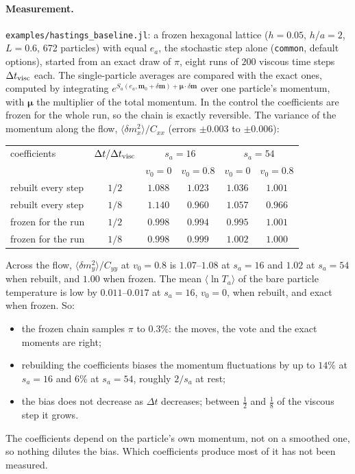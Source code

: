\documentclass[11pt,aps,preprint,nofootinbib,superscriptaddress,tightenlines]{revtex4-2}
\let\oldparagraph\paragraph
\renewcommand{\paragraph}{\par\bigskip\oldparagraph}
\begin{document}
\paragraph{Measurement.}  \texttt{examples/hastings\_baseline.jl}: a frozen hexagonal lattice ($h=0.05$, $h/a=2$, $L=0.6$, 672
particles) with equal $e_a$, the stochastic step alone (\texttt{common}, default options), started from an exact draw of $\pi$, eight
runs of $200$ viscous time steps $\Delta t_{\rm visc}$ each.  The single-particle averages are compared with the exact ones, computed
by integrating $e^{S_a(e_a,\bm m_0+\delta\bm m)+\bm\mu\cdot\delta\bm m}$ over one particle's momentum, with $\bm\mu$ the multiplier of the
total momentum.  In the control the coefficients are frozen for the whole run, so the chain is exactly reversible.  The variance of
the momentum along the flow, $\langle\delta m_x^2\rangle/C_{xx}$ (errors $\pm0.003$ to $\pm0.006$):
\begin{center}
\begin{tabular}{lccccc}
\hline
coefficients & $\Delta t/\Delta t_{\rm visc}$ & \multicolumn{2}{c}{$s_a=16$} & \multicolumn{2}{c}{$s_a=54$} \\
 & & $v_0=0$ & $v_0=0.8$ & $v_0=0$ & $v_0=0.8$ \\ \hline
rebuilt every step & $1/2$ & $1.088$ & $1.023$ & $1.036$ & $1.001$ \\
rebuilt every step & $1/8$ & $1.140$ & $0.960$ & $1.057$ & $0.966$ \\
frozen for the run & $1/2$ & $0.998$ & $0.994$ & $0.995$ & $1.001$ \\
frozen for the run & $1/8$ & $0.998$ & $0.999$ & $1.002$ & $1.000$ \\
\hline
\end{tabular}
\end{center}
Across the flow, $\langle\delta m_y^2\rangle/C_{yy}$ at $v_0=0.8$ is $1.07$--$1.08$ at $s_a=16$ and $1.02$ at $s_a=54$ when rebuilt, and $1.00$
when frozen.  The mean $\langle\ln T_a\rangle$ of the bare particle temperature is low by $0.011$--$0.017$ at $s_a=16$, $v_0=0$, when rebuilt,
and exact when frozen.  So:
\begin{itemize}
\item the frozen chain samples $\pi$ to $0.3\%$: the moves, the vote and the exact moments are right;
\item rebuilding the coefficients biases the momentum fluctuations by up to $14\%$ at $s_a=16$ and $6\%$ at $s_a=54$, roughly
  $2/s_a$ at rest;
\item the bias does not decrease as $\Delta t$ decreases; between $\tfrac12$ and $\tfrac18$ of the viscous step it grows.
\end{itemize}
The coefficients depend on the particle's own momentum, not on a smoothed one, so nothing dilutes the bias.  Which coefficients
produce most of it has not been measured.
\end{document}
